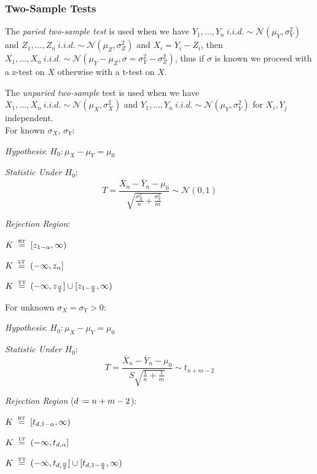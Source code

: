 \documentclass[8pt,a4paper]{extarticle}     %
\newcommand{\colfill}{\vfill\eject\columnbreak}
\newcommand{\colnull}{\vfill\null\columnbreak}
\newcommand{\eqtxt}[1]{\mathrel{\stackrel{\makebox[0pt]{\mbox{\normalfont\tiny #1}}}{=}}}
\newcommand{\eqdef}{\mathrel{\vcenter{\baselineskip0.5ex\lineskiplimit0pt\hbox{\scriptsize.}\hbox{\scriptsize.}}}=}
\begin{document}
\begin{multicols}{4}
\colfill  

\subsubsection*{Two-Sample Tests}
\begin{boxdefinition}
	The \textit{paried two-sample test} is used when we have $Y_1,\dots,Y_n \ i.i.d. \sim \mathcal{N}(\mu_Y,\sigma_Y^2)$ and $Z_1,\dots,Z_n \ i.i.d. \sim \mathcal{N}(\mu_Z,\sigma_Z^2)$ and $X_i=Y_i-Z_i$, then $X_1,\dots,X_n \ i.i.d. \sim \mathcal{N}(\mu_Y-\mu_Z, \sigma=\sigma_Y^2-\sigma_Z^2)$, thus if $\sigma$ is known we proceed with a z-test on $X$ otherwise with a t-test on $X$. 
\end{boxdefinition}
\begin{boxdefinition} 
	The \textit{unparied two-sample} test is used when we have $X_1,\dots,X_n \ i.i.d. \sim \mathcal{N}(\mu_X,\sigma_X^2)$ and $Y_1,\dots,Y_n \ i.i.d. \sim \mathcal{N}(\mu_Y,\sigma_Y^2)$ for $X_i,Y_j$ independent. \\ 
	For known $\sigma_X$, $\sigma_Y$: 
	\begin{listnr}
		\item \textit{Hypothesis}: $H_0: \mu_X-\mu_Y=\mu_0$ 
		\item \textit{Statistic Under $H_0$}:
		\[
			T=\frac{\overline{X}_n-\overline{Y}_n-\mu_0}{\sqrt{\frac{\sigma_X^2}{n}+\frac{\sigma_Y^2}{m}}} \sim \mathcal{N}(0,1)
		\]
		\item \textit{Rejection Region}:
		\begin{listb}
			\item $K \ \eqtxt{RT} \	\left[z_{1-\alpha},\infty\right)$
			\item $K \ \eqtxt{LT} \ \left(-\infty, z_\alpha\right]$
			\item $K \ \eqtxt{TT} \ (-\infty, z_{\frac{\alpha}{2}}]\cup [z_{1-\frac{\alpha}{2}},\infty)$
		\end{listb}
	\end{listnr}	
	For unknown $\sigma_X=\sigma_Y>0$: 	
	\begin{listnr}
		\item \textit{Hypothesis}: $H_0: \mu_X-\mu_Y=\mu_0$ 
		\item \textit{Statistic Under $H_0$}:
		\[
			T=\frac{\overline{X}_n-\overline{Y}_n-\mu_0}{S\sqrt{\frac{1}{n}+\frac{1}{m}}} \sim t_{n+m-2}
		\]
		\item \textit{Rejection Region} ($d\eqdef n+m-2$): 
		\begin{listb}
			\item $K \ \eqtxt{RT} \ \left[t_{d,1-\alpha},\infty\right)$
			\item $K \ \eqtxt{LT} \ \left(-\infty, t_{d,\alpha}\right]$
			\item $K \ \eqtxt{TT} \ (-\infty, t_{d,\frac{\alpha}{2}}]\cup [t_{d,1-\frac{\alpha}{2}},\infty)$
		\end{listb}
	\end{listnr}	
\end{boxdefinition}
\colnull 


\end{multicols}
\end{document}
